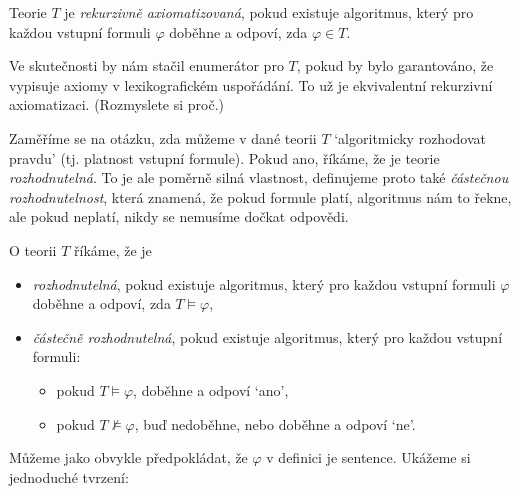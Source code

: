 \begin{definition}
    Teorie $T$ je \emph{rekurzivně axiomatizovaná}, pokud existuje algoritmus, který pro každou vstupní formuli $\varphi$ doběhne a odpoví, zda $\varphi\in T$.
\end{definition}

\begin{remark}
    Ve skutečnosti by nám stačil enumerátor pro $T$, pokud by bylo garantováno, že vypisuje axiomy v lexikografickém uspořádání. To už je ekvivalentní rekurzivní axiomatizaci. (Rozmyslete si proč.)
\end{remark}

Zaměříme se na otázku, zda můžeme v dané teorii $T$ `algoritmicky rozhodovat pravdu' (tj. platnost vstupní formule). Pokud ano, říkáme, že je teorie \emph{rozhodnutelná}. To je ale poměrně silná vlastnost, definujeme proto také \emph{částečnou rozhodnutelnost}, která znamená, že pokud formule platí, algoritmus nám to řekne, ale pokud neplatí, nikdy se nemusíme dočkat odpovědi.

\begin{definition}[Rozhodnutelnost]
O teorii $T$ říkáme, že je
\begin{itemize}
    \item \emph{rozhodnutelná}, pokud existuje algoritmus, který pro každou vstupní formuli $\varphi$ doběhne a odpoví, zda $T\models\varphi$,
    \item \emph{částečně rozhodnutelná}, pokud existuje algoritmus, který pro každou vstupní formuli:
    \begin{itemize}
        \item pokud $T\models\varphi$, doběhne a odpoví `ano',
        \item pokud $T\not\models\varphi$, buď nedoběhne, nebo doběhne a odpoví `ne'.
    \end{itemize}
\end{itemize}
\end{definition}
Můžeme jako obvykle předpokládat, že $\varphi$ v definici je sentence. Ukážeme si jednoduché tvrzení:

